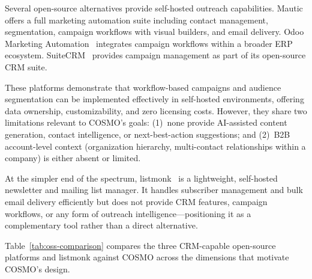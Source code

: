 \documentclass[a4paper]{article}
\begin{document}
Several open-source alternatives provide self-hosted outreach
capabilities. Mautic~\cite{mautic_docs} offers a full marketing
automation suite including contact management, segmentation, campaign
workflows with visual builders, and email delivery. Odoo Marketing
Automation~\cite{odoo_marketing_automation} integrates campaign
workflows within a broader ERP ecosystem.
SuiteCRM~\cite{suitecrm_campaigns} provides campaign management as
part of its open-source CRM suite.

These platforms demonstrate that workflow-based campaigns and audience
segmentation can be implemented effectively in self-hosted
environments, offering data ownership, customizability, and zero
licensing costs. However, they share two limitations relevant to
COSMO's goals: (1)~none provide AI-assisted content generation,
contact intelligence, or next-best-action suggestions; and (2)~B2B
account-level context (organization hierarchy, multi-contact
relationships within a company) is either absent or limited.

At the simpler end of the spectrum, listmonk~\cite{listmonk_github}
is a lightweight, self-hosted newsletter and mailing list manager. It
handles subscriber management and bulk email delivery efficiently but
does not provide CRM features, campaign workflows, or any form of
outreach intelligence---positioning it as a complementary tool rather
than a direct alternative.

Table~\ref{tab:oss-comparison} compares the three CRM-capable
open-source platforms and listmonk against COSMO across the
dimensions that motivate COSMO's design.
\end{document}
